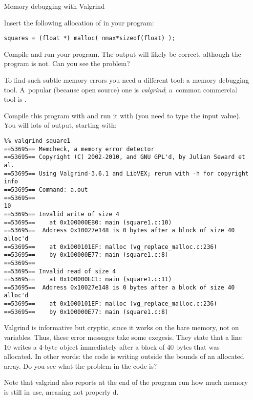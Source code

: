  {Memory debugging with Valgrind}
\label{sec:valgrind}

Insert the following allocation of  in your program:
\begin{verbatim}
squares = (float *) malloc( nmax*sizeof(float) );
\end{verbatim}
Compile and run your program. The output will likely be correct,
although the program is not. Can you see the problem?


To find such subtle memory errors you need a different tool: a memory
debugging tool. A~popular (because open source) one is
\emph{valgrind}; a~common commercial tool is .


Compile this program with  and run it with
 (you need to type the input value). You will lots
of output, starting with:
{\small
\begin{verbatim}
%% valgrind square1
==53695== Memcheck, a memory error detector
==53695== Copyright (C) 2002-2010, and GNU GPL'd, by Julian Seward et al.
==53695== Using Valgrind-3.6.1 and LibVEX; rerun with -h for copyright info
==53695== Command: a.out
==53695== 
10
==53695== Invalid write of size 4
==53695==    at 0x100000EB0: main (square1.c:10)
==53695==  Address 0x10027e148 is 0 bytes after a block of size 40 alloc'd
==53695==    at 0x1000101EF: malloc (vg_replace_malloc.c:236)
==53695==    by 0x100000E77: main (square1.c:8)
==53695== 
==53695== Invalid read of size 4
==53695==    at 0x100000EC1: main (square1.c:11)
==53695==  Address 0x10027e148 is 0 bytes after a block of size 40 alloc'd
==53695==    at 0x1000101EF: malloc (vg_replace_malloc.c:236)
==53695==    by 0x100000E77: main (square1.c:8)
\end{verbatim}
}
Valgrind is informative but cryptic, since it works on the bare
memory, not on variables. Thus, these error messages take some
exegesis. They state that a line 10 writes a 4-byte object immediately
after a block of 40 bytes that was allocated. In other words: the code
is writing outside the bounds of an allocated array. Do you see what
the problem in the code is?

Note that valgrind also reports at the end of the program run how much
memory is still in use, meaning not properly d.

